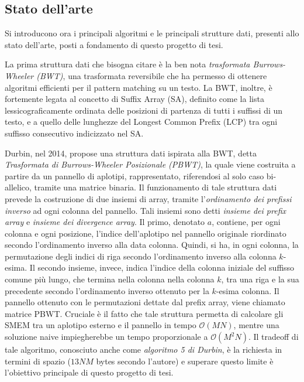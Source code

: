 \documentclass[a4paper,11pt, oneside,italian]{article}
\begin{document}
\subsection*{Stato dell'arte}
Si introducono ora i principali algoritmi e le principali strutture dati,
presenti allo stato dell'arte, posti a fondamento di questo progetto di tesi.

La prima struttura dati che bisogna citare è la  ben nota \textit{trasformata
  Burrows-Wheeler (BWT)}, una trasformata reversibile che ha permesso di
ottenere algoritmi efficienti per il pattern matching su un testo.
La BWT, inoltre, è fortemente legata al concetto di Suffix Array (SA), definito
come la lista lessicograficamente ordinata delle posizioni di partenza di 
tutti i suffissi di un testo, e a quello delle lunghezze del Longest Common
Prefix (LCP) tra ogni suffisso consecutivo indicizzato nel SA.

Durbin, nel 2014, propose una struttura dati ispirata alla BWT, detta
\textit{Trasformata di Burrows-Wheeler Posizionale (PBWT)}, la quale viene
costruita a partire da un pannello di aplotipi, rappresentato, riferendosi al
solo caso bi-allelico, tramite una matrice binaria. Il funzionamento di tale
struttura dati prevede la costruzione di due insiemi di array, tramite
l'\textit{ordinamento dei prefissi inverso} ad ogni colonna del pannello.
Tali insiemi sono detti \textit{insieme dei prefix array} e \textit{insieme dei
  divergence array}. Il primo, denotato $a$, contiene, per ogni colonna e ogni
posizione, l'indice dell'aplotipo nel pannello originale riordinato secondo
l'ordinamento inverso alla data colonna. Quindi, si ha, in ogni colonna, la
permutazione degli indici di riga secondo l'ordinamento inverso alla colonna
$k$-esima. 
Il secondo insieme, invece, indica l'indice della colonna iniziale del suffisso
comune più lungo, che termina nella colonna nella colonna $k$, tra una riga e la
sua precedente secondo l'ordinamento inverso ottenuto per la $k$-esima colonna.
Il pannello ottenuto con le permutazioni dettate dal prefix array, viene
chiamato matrice PBWT.
Cruciale è il fatto che tale struttura permetta di calcolare gli SMEM tra
un aplotipo esterno e il pannello in tempo $\mathcal{O}(MN)$, mentre 
una soluzione naive impiegherebbe un tempo proporzionale a
$\mathcal{O}(M^2N)$. Il tradeoff di tale algoritmo, conosciuto anche come
\textit{algoritmo 5 di Durbin}, è la richiesta in termini di spazio ($13NM$
bytes secondo l'autore) e superare questo limite è l'obiettivo principale di
questo progetto di tesi. 
\end{document}
